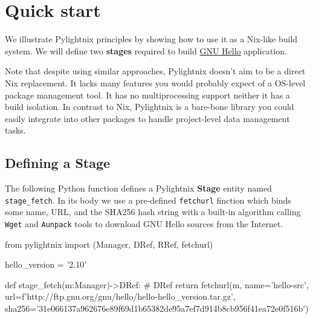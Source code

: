 \section{Quick start}

We illustrate Pylightnix principles by showing how to use it as a Nix-like build
system. We will define two \textbf{stages} required to build
\href{https://www.gnu.org/software/hello/}{GNU Hello} application.

Note that despite using similar approaches, Pylightnix doesn't aim to be a
direct Nix replacement. It lacks many features you would probably expect of a
OS-level package management tool. It has no multiprocessing support neither it
has a build isolation. In contrast to Nix, Pylightnix is a bare-bone library you
could easily integrate into other packages to handle project-level data
management tasks.

\subsection{Defining a Stage}

The following Python function defines a Pylightnix \textbf{Stage} entity named
\texttt{stage\_fetch}. In its body we use a pre-defined \texttt{fetchurl}
finction which binds some name, URL, and the SHA256 hash string with a built-in
algorithm calling \texttt{Wget} and \texttt{Aunpack} tools to download GNU Hello
sources from the Internet.

\begin{pythontexcode}
from pylightnix import (Manager, DRef, RRef, fetchurl)

hello_version = '2.10'

def stage_fetch(m:Manager)->DRef: # DRef \label{DREF}
  return fetchurl(m,
    name='hello-src',
    url=f'http://ftp.gnu.org/gnu/hello/hello-{hello_version}.tar.gz',
    sha256='31e066137a962676e89f69d1b65382de95a7ef7d914b8cb956f41ea72e0f516b')
\end{pythontexcode}

